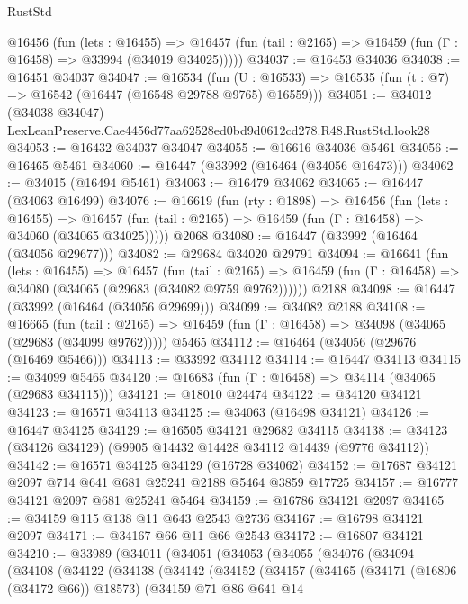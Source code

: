 \begin{lexlean}{RustStd}
\begin{coremodule}
    @16456
      (fun (lets : @16455) =>
      @16457 (fun (tail : @2165) => @16459 (fun (Γ : @16458) => @33994 (@34019 @34025)))))
@34037 := @16453 @34036
@34038 := @16451 @34037
@34047 := @16534
    (fun (U : @16533) => @16535 (fun (t : @7) => @16542 (@16447 (@16548 @29788 @9765) @16559)))
@34051 := @34012
    (@34038 @34047)
    LexLeanPreserve.Cae4456d77aa62528ed0bd9d0612cd278.R48.RustStd.look28
@34053 := @16432 @34037 @34047
@34055 := @16616 @34036 @5461
@34056 := @16465 @5461
@34060 := @16447 (@33992 (@16464 (@34056 @16473)))
@34062 := @34015 (@16494 @5461)
@34063 := @16479 @34062
@34065 := @16447 (@34063 @16499)
@34076 := @16619
    (fun (rty : @1898) =>
    @16456
      (fun (lets : @16455) =>
      @16457 (fun (tail : @2165) => @16459 (fun (Γ : @16458) => @34060 (@34065 @34025)))))
    @2068
@34080 := @16447 (@33992 (@16464 (@34056 @29677)))
@34082 := @29684 @34020 @29791
@34094 := @16641
    (fun (lets : @16455) =>
    @16457
      (fun (tail : @2165) =>
      @16459 (fun (Γ : @16458) => @34080 (@34065 (@29683 (@34082 @9759 @9762))))))
    @2188
@34098 := @16447 (@33992 (@16464 (@34056 @29699)))
@34099 := @34082 @2188
@34108 := @16665
    (fun (tail : @2165) => @16459 (fun (Γ : @16458) => @34098 (@34065 (@29683 (@34099 @9762)))))
    @5465
@34112 := @16464 (@34056 (@29676 (@16469 @5466)))
@34113 := @33992 @34112
@34114 := @16447 @34113
@34115 := @34099 @5465
@34120 := @16683 (fun (Γ : @16458) => @34114 (@34065 (@29683 @34115)))
@34121 := @18010 @24474
@34122 := @34120 @34121
@34123 := @16571 @34113
@34125 := @34063 (@16498 @34121)
@34126 := @16447 @34125
@34129 := @16505 @34121 @29682 @34115
@34138 := @34123 (@34126 @34129) (@9905 @14432 @14428 @34112 @14439 (@9776 @34112))
@34142 := @16571 @34125 @34129 (@16728 @34062)
@34152 := @17687 @34121 @2097 @714 @641 @681 @25241 @2188 @5464 @3859 @17725
@34157 := @16777 @34121 @2097 @681 @25241 @5464
@34159 := @16786 @34121 @2097
@34165 := @34159 @115 @138 @11 @643 @2543 @2736
@34167 := @16798 @34121 @2097
@34171 := @34167 @66 @11 @66 @2543
@34172 := @16807 @34121
@34210 := @33989
    (@34011
      (@34051
        (@34053
          (@34055
            (@34076
              (@34094
                (@34108
                  (@34122
                    (@34138
                      (@34142
                        (@34152
                          (@34157
                            (@34165
                              (@34171 (@16806 (@34172 @66)) @18573)
                              (@34159
                                @71
                                @86
                                @641
                                @14

\end{coremodule}
\end{lexlean}
